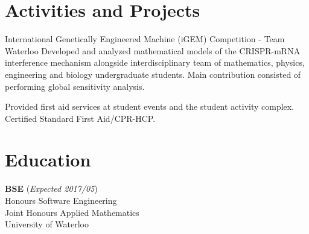 \documentclass[oneside, 10pt]{memoir}
\begin{document}
\section*{Activities and Projects}
\begin{adjustwidth}{1em}{0em}%

    {International Genetically Engineered Machine (iGEM) Competition - Team Waterloo} {
        Developed and analyzed mathematical models of the CRISPR-mRNA interference mechanism alongside
        interdisciplinary team of mathematics, physics, engineering and biology undergraduate students.
        Main contribution consisted of performing global sensitivity analysis.
    }

     {
        Provided first aid services at student events and the student activity complex. 
        Certified Standard First Aid/CPR-HCP.
    }
\end{adjustwidth}

\section*{Education}
\begin{adjustwidth}{1em}{0em}%
\textbf{BSE} (\emph{Expected 2017/05}) \\
Honours Software Engineering\\
Joint Honours Applied Mathematics\\
University of Waterloo
\end{adjustwidth}
\end{document}

